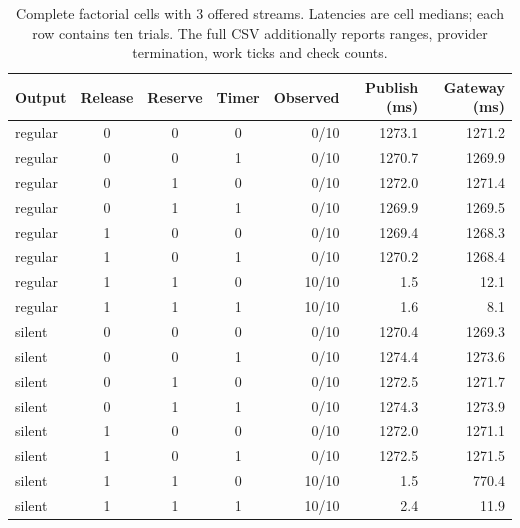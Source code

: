 \begin{table}[ht]\centering\small\begin{tabular}{@{}lccc r r r@{}}
\toprule Output & Release & Reserve & Timer & Observed & Publish (ms) & Gateway (ms)\\\midrule
regular & 0 & 0 & 0 & 0/10 & 1273.1 & 1271.2 \\
regular & 0 & 0 & 1 & 0/10 & 1270.7 & 1269.9 \\
regular & 0 & 1 & 0 & 0/10 & 1272.0 & 1271.4 \\
regular & 0 & 1 & 1 & 0/10 & 1269.9 & 1269.5 \\
regular & 1 & 0 & 0 & 0/10 & 1269.4 & 1268.3 \\
regular & 1 & 0 & 1 & 0/10 & 1270.2 & 1268.4 \\
regular & 1 & 1 & 0 & 10/10 & 1.5 & 12.1 \\
regular & 1 & 1 & 1 & 10/10 & 1.6 & 8.1 \\
silent & 0 & 0 & 0 & 0/10 & 1270.4 & 1269.3 \\
silent & 0 & 0 & 1 & 0/10 & 1274.4 & 1273.6 \\
silent & 0 & 1 & 0 & 0/10 & 1272.5 & 1271.7 \\
silent & 0 & 1 & 1 & 0/10 & 1274.3 & 1273.9 \\
silent & 1 & 0 & 0 & 0/10 & 1272.0 & 1271.1 \\
silent & 1 & 0 & 1 & 0/10 & 1272.5 & 1271.5 \\
silent & 1 & 1 & 0 & 10/10 & 1.5 & 770.4 \\
silent & 1 & 1 & 1 & 10/10 & 2.4 & 11.9 \\
\bottomrule\end{tabular}\caption{Complete factorial cells with 3 offered streams. Latencies are cell medians; each row contains ten trials. The full CSV additionally reports ranges, provider termination, work ticks and check counts.}\end{table}
